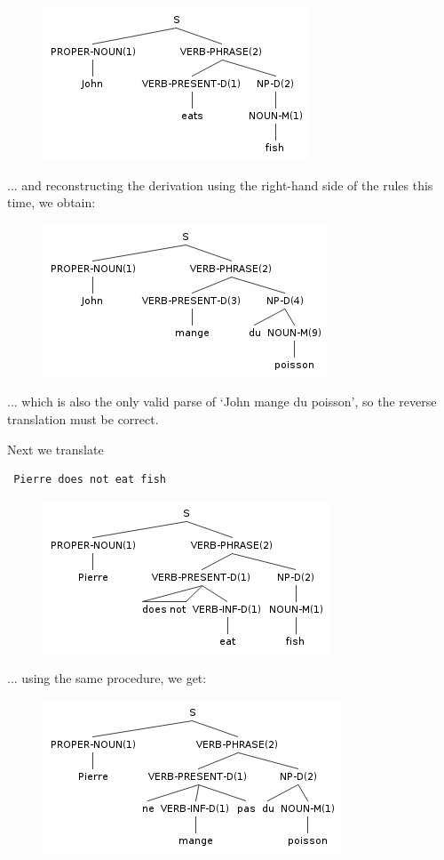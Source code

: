 \documentclass[11pt]{article}
\begin{document}
\begin{figure}[H]
\includegraphics[scale=0.8]{john-eats-fish.png}
\end{figure}

... and reconstructing the derivation using the right-hand side of the rules this time, we obtain:

\begin{figure}[H]
\includegraphics[scale=0.8]{john-mange-du-poisson.png}
\end{figure}

... which is also the only valid parse of `John mange du poisson', so the reverse translation must be correct.

Next we translate \begin{verbatim} Pierre does not eat fish \end{verbatim}

\begin{figure}[H]
\includegraphics[scale=0.8]{pierre-does-not-eat-fish.png}
\end{figure}

... using the same procedure, we get:

\begin{figure}[H]
\includegraphics[scale=0.8]{pierre-ne-mange-pas-du-poisson.png}
\end{figure}
\end{document}
